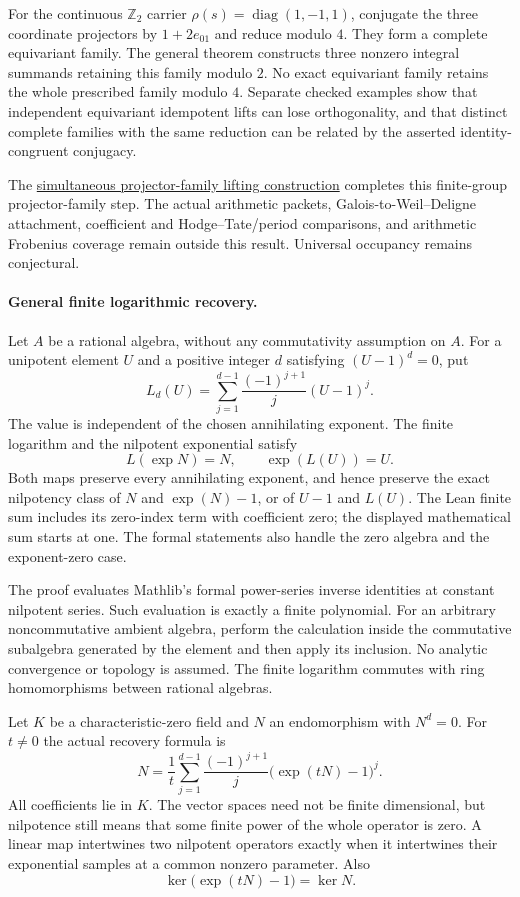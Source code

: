 \documentclass[11pt]{article}
\theoremstyle{definition}
\theoremstyle{remark}
\begin{document}
For the continuous $\mathbb Z_2$ carrier
$\rho(s)=\operatorname{diag}(1,-1,1)$, conjugate the three coordinate
projectors by $1+2e_{01}$ and reduce modulo $4$. They form a complete
equivariant family. The general theorem constructs three nonzero integral
summands retaining this family modulo $2$. No exact equivariant family
retains the whole prescribed family modulo $4$. Separate checked examples
show that independent equivariant idempotent lifts can lose orthogonality,
and that distinct complete families with the same reduction can be related
by the asserted identity-congruent conjugacy.

The \hyperref[book:x-construction-19]{simultaneous projector-family lifting construction} completes this finite-group projector-family step. The actual
arithmetic packets, Galois-to-Weil--Deligne attachment, coefficient and
Hodge--Tate/period comparisons, and arithmetic Frobenius coverage remain
outside this result. Universal occupancy remains conjectural.


\paragraph{General finite logarithmic recovery.}\label{book:x-construction-20}
Let $A$ be a rational algebra, without any commutativity assumption on $A$.
For a unipotent element $U$ and a positive integer $d$ satisfying
$(U-1)^d=0$, put
\[
L_d(U)=\sum_{j=1}^{d-1}\frac{(-1)^{j+1}}{j}(U-1)^j.
\]
The value is independent of the chosen annihilating exponent. The finite
logarithm and the nilpotent exponential satisfy
\[
L(\exp N)=N,\qquad \exp(L(U))=U.
\]
Both maps preserve every annihilating exponent, and hence preserve the
exact nilpotency class of $N$ and $\exp(N)-1$, or of $U-1$ and $L(U)$.
The Lean finite sum includes its zero-index term with coefficient zero;
the displayed mathematical sum starts at one. The formal statements also
handle the zero algebra and the exponent-zero case.

The proof evaluates Mathlib's formal power-series inverse identities at
constant nilpotent series. Such evaluation is exactly a finite polynomial.
For an arbitrary noncommutative ambient algebra, perform the calculation
inside the commutative subalgebra generated by the element and then apply
its inclusion. No analytic convergence or topology is assumed. The
finite logarithm commutes with ring homomorphisms between rational algebras.

Let $K$ be a characteristic-zero field and $N$ an endomorphism with
$N^d=0$. For $t\ne0$ the actual recovery formula is
\[
N=\frac1t\sum_{j=1}^{d-1}\frac{(-1)^{j+1}}{j}
       \bigl(\exp(tN)-1\bigr)^j.
\]
All coefficients lie in $K$. The vector spaces need not be finite
dimensional, but nilpotence still means that some finite power of the
whole operator is zero. A linear map intertwines two nilpotent operators exactly
when it intertwines their exponential samples at a common nonzero
parameter. Also
\[
\ker\bigl(\exp(tN)-1\bigr)=\ker N.
\]
\end{document}
